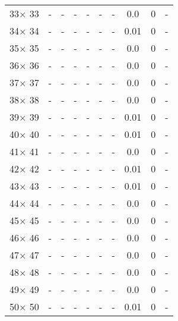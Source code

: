 \documentclass[main.tex]{subfiles}
\begin{document}
\begin{table}
\begin{tabular}{|c||c|c|c|c|c|c||c|c|c|}
33$\times$ 33 & - & - & - & - & - & - &0.0 &0 &-\\
34$\times$ 34 & - & - & - & - & - & - &0.01 &0 &-\\
35$\times$ 35 & - & - & - & - & - & - &0.0 &0 &-\\
36$\times$ 36 & - & - & - & - & - & - &0.0 &0 &-\\
37$\times$ 37 & - & - & - & - & - & - &0.0 &0 &-\\
38$\times$ 38 & - & - & - & - & - & - &0.0 &0 &-\\
39$\times$ 39 & - & - & - & - & - & - &0.01 &0 &-\\
40$\times$ 40 & - & - & - & - & - & - &0.01 &0 &-\\
41$\times$ 41 & - & - & - & - & - & - &0.0 &0 &-\\
42$\times$ 42 & - & - & - & - & - & - &0.01 &0 &-\\
43$\times$ 43 & - & - & - & - & - & - &0.01 &0 &-\\
44$\times$ 44 & - & - & - & - & - & - &0.0 &0 &-\\
45$\times$ 45 & - & - & - & - & - & - &0.0 &0 &-\\
46$\times$ 46 & - & - & - & - & - & - &0.0 &0 &-\\
47$\times$ 47 & - & - & - & - & - & - &0.0 &0 &-\\
48$\times$ 48 & - & - & - & - & - & - &0.0 &0 &-\\
49$\times$ 49 & - & - & - & - & - & - &0.0 &0 &-\\
50$\times$ 50 & - & - & - & - & - & - &0.01 &0 &-\\
\hline
\end{tabular}
\end{table}
\end{document}

